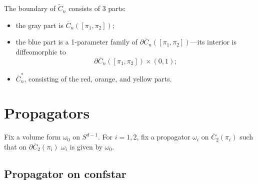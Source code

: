 \documentclass[11pt]{article}
\theoremstyle{definition}
\theoremstyle{remark}
\def\wt#1{\widetilde{#1}}
\def\ov#1{\overline{#1}}
\begin{document}
The boundary of $\wt{C}_n$ consists of 3 parts: 
\begin{itemize}
\item the gray part is $\ov{C}_n([\pi_1,\pi_2])$;
\item the blue part is a 1-parameter family of $\partial \ov{C}_n([\pi_1,\pi_2])$---its interior is diffeomorphic to 
$$\partial \ov{C}_n([\pi_1,\pi_2])\times (0,1);$$
\item $\ov{C}^*_n$, consisting of the red, orange, and yellow parts. 
\end{itemize}

\section{Propagators}

Fix a volume form $\omega_0$ on $S^{d-1}$. 
For $i=1,2$, fix a propagator $\omega_i$ on $\ov{C}_2(\pi_i)$ such that on $\partial\ov{C}_2(\pi_i)$ $\omega_i$ is given by $\omega_0$. 

\subsection{Propagator on confstar}
\end{document}
